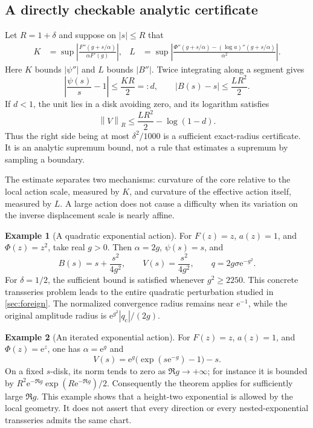 \documentclass[11pt,a4paper]{article}
\numberwithin{equation}{section}
\theoremstyle{definition}
\newtheorem{example}[example]{Example}
\theoremstyle{remark}
\newcommand{\e}{\mathrm e}
\newcommand{\qcv}{q_{\mathrm c}}
\newcommand{\norm}[1]{\left\lVert#1\right\rVert}
\begin{document}
\subsection{A directly checkable analytic certificate}
Let $R=1+\delta$ and suppose on $|s|\leq R$ that
\begin{align}
 K&=\sup\left|\frac{F''(g+s/\alpha)}{\alpha F'(g)}\right|,
 &L&=\sup\left|\frac{\Phi''(g+s/\alpha)
                   -(\log a)''(g+s/\alpha)}{\alpha^2}\right|.
 \label{eq:KL}
\end{align}
Here $K$ bounds $|\psi''|$ and $L$ bounds $|B''|$. Twice integrating along a segment gives
\[
 \left|\frac{\psi(s)}s-1\right|\leq\frac{KR}{2}=:d,
 \qquad |B(s)-s|\leq\frac{LR^2}{2}.
\]
If $d<1$, the unit lies in a disk avoiding zero, and its logarithm satisfies
\begin{equation}
 \norm V_R\leq\frac{LR^2}{2}-\log(1-d).
 \label{eq:V-certificate}
\end{equation}
Thus the right side being at most $\delta^2/1000$ is a sufficient exact-radius certificate. It is an analytic supremum bound, not a rule that estimates a supremum by sampling a boundary.

The estimate separates two mechanisms: curvature of the core relative to the local action scale, measured by $K$, and curvature of the effective action itself, measured by $L$. A large action does not cause a difficulty when its variation on the inverse displacement scale is nearly affine.

\begin{example}[A quadratic exponential action]
For $F(z)=z$, $a(z)=1$, and $\Phi(z)=z^2$, take real $g>0$. Then $\alpha=2g$, $\psi(s)=s$, and
\[
 B(s)=s+\frac{s^2}{4g^2},\qquad V(s)=\frac{s^2}{4g^2},
 \qquad q=2g\sigma\e^{-g^2}.
\]
For $\delta=1/2$, the sufficient bound is satisfied whenever $g^2\geq2250$. This concrete transseries problem leads to the entire quadratic perturbation studied in \cref{sec:foreign}. The normalized convergence radius remains near $\e^{-1}$, while the original amplitude radius is $\e^{g^2}|\qcv|/(2g)$.
\end{example}

\begin{example}[An iterated exponential action]
For $F(z)=z$, $a(z)=1$, and $\Phi(z)=\e^z$, one has $\alpha=\e^g$ and
\[
 V(s)=\e^g\bigl(\exp(s\e^{-g})-1\bigr)-s.
\]
On a fixed $s$-disk, its norm tends to zero as $\Re g\to+\infty$; for instance it is bounded by
$R^2\e^{-\Re g}\exp(R\e^{-\Re g})/2$.
Consequently the theorem applies for sufficiently large $\Re g$. This example shows that a height-two exponential is allowed by the local geometry. It does not assert that every direction or every nested-exponential transseries admits the same chart.
\end{example}
\end{document}

